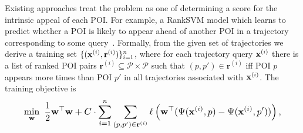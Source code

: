 Existing approaches treat the problem as one of determining a score for the intrinsic appeal of each POI.
For example, a RankSVM model
which %
learns to predict whether a POI is likely to appear ahead of another POI in a trajectory corresponding to some query~\cite{cikm16paper}.
Formally,
from the given set of trajectories
we derive a training set
$\{ ( \mathbf{x}^{(i)}, \mathbf{r}^{(i)} ) \}_{i = 1}^n$,
where for each trajectory query $\mathbf{x}^{(i)}$ there is a list of ranked POI pairs
$\mathbf{r}^{(i)} \subseteq \mathcal{P} \times \mathcal{P}$
such that
$(p, p') \in \mathbf{r}^{(i)}$
iff
POI $p$ appears more times than POI $p'$ in all trajectories associated with $\mathbf{x}^{(i)}$. %
The training objective is %
\begin{align}
\resizebox{0.909\linewidth}{!}{$\displaystyle
\displaystyle \min_{\w} ~\frac{1}{2} \w^\top \w + C \cdot \sum_{i = 1}^n \sum_{(p, p') \in \mathbf{r}^{(i)}}
\ell\left( \w^\top ( \Psi( \x^{(i)}, p ) - \Psi( \x^{(i)}, p' ) ) \right),
$} \label{eq:ranksvm}
\end{align}

